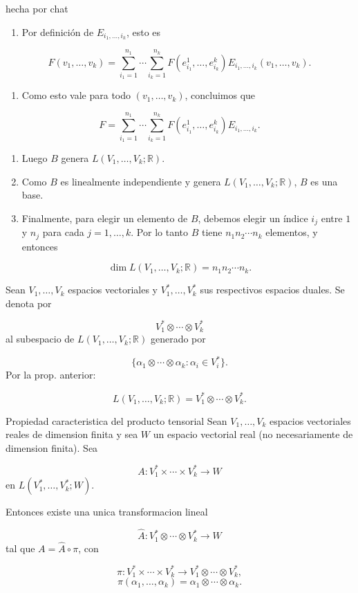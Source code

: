 \begin{bookproof}{hecha por chat}
\[\]
\begin{enumerate}[start=18]
\item Por definición de $E_{i_1,\ldots,i_k}$, esto es
\end{enumerate}
\[
F(v_1,\ldots,v_k)=\sum_{i_1=1}^{n_1}\cdots\sum_{i_k=1}^{n_k}F(e^1_{i_1},\ldots,e^k_{i_k})E_{i_1,\ldots,i_k}(v_1,\ldots,v_k).
\]
\begin{enumerate}[start=19]
\item Como esto vale para todo $(v_1,\ldots,v_k)$, concluimos que
\end{enumerate}
\[
F=\sum_{i_1=1}^{n_1}\cdots\sum_{i_k=1}^{n_k}F(e^1_{i_1},\ldots,e^k_{i_k})E_{i_1,\ldots,i_k}.
\]
\begin{enumerate}[start=20]
\item Luego $B$ genera $L(V_1,\ldots,V_k;\mathbb R)$.
\item Como $B$ es linealmente independiente y genera $L(V_1,\ldots,V_k;\mathbb R)$, $B$ es una base.
\item Finalmente, para elegir un elemento de $B$, debemos elegir un índice $i_j$ entre $1$ y $n_j$ para cada $j=1,\ldots,k$. Por lo tanto $B$ tiene $n_1n_2\cdots n_k$ elementos, y entonces
\end{enumerate}
\[
\dim L(V_1,\ldots,V_k;\mathbb R)=n_1n_2\cdots n_k.
\]
\bookqed
\end{bookproof}
\begin{bookdefinition}{}
Sean $V_1,\ldots,V_k$ espacios vectoriales y $V_1^*,\ldots,V_k^*$ sus respectivos espacios duales. Se denota por

\[
V_1^*\otimes\cdots\otimes V_k^*
\]
al subespacio de $L(V_1,\ldots,V_k;\mathbb R)$ generado por

\[
\{\alpha_1\otimes\cdots\otimes\alpha_k:\alpha_i\in V_i^*\}.
\]
Por la prop. anterior:

\[
L(V_1,\ldots,V_k;\mathbb R)=V_1^*\otimes\cdots\otimes V_k^*.
\]
\end{bookdefinition}
\begin{bookproposition}{Propiedad caracteristica del producto tensorial}
Sean $V_1,\ldots,V_k$ espacios vectoriales reales de dimension finita y sea $W$ un espacio vectorial real (no necesariamente de dimension finita). Sea

\[
A:V_1^*\times\cdots\times V_k^*\to W
\]
en $L(V_1^*,\ldots,V_k^*;W)$.

Entonces existe una unica transformacion lineal

\[
\hat A:V_1^*\otimes\cdots\otimes V_k^*\to W
\]
tal que $A=\hat A\circ\pi$, con

\[
\pi:V_1^*\times\cdots\times V_k^*\to V_1^*\otimes\cdots\otimes V_k^*,
\]
\[
\pi(\alpha_1,\ldots,\alpha_k)=\alpha_1\otimes\cdots\otimes\alpha_k.
\]
\end{bookproposition}
